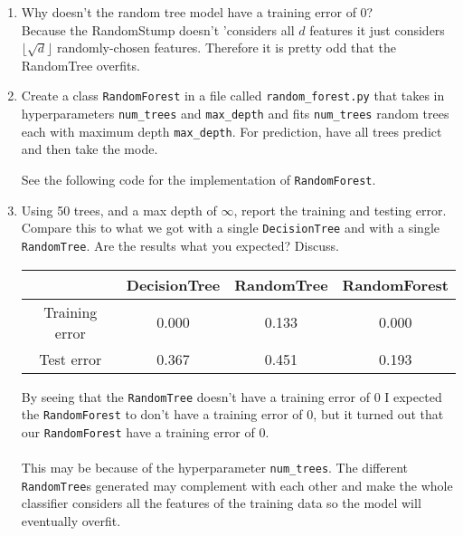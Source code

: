 \documentclass{article}
\def\blu#1{{\color{blu}#1}}
\def\ans#1{{\color{ans}#1}}
\def\enum#1{\begin{enumerate}#1\end{enumerate}}
\begin{document}
\blu{
\enum{
\item Why doesn't the random tree model have a training error of 0? \\
\ans{
   Because the RandomStump doesn't 'considers all $d$ features it just considers 
   $\lfloor \sqrt{d} \rfloor$ randomly-chosen features. Therefore it is pretty odd that the RandomTree 
   overfits.
}
\item Create a class \texttt{RandomForest} in a file called \texttt{random\string_forest.py} that takes in hyperparameters \texttt{num\string_trees} and \texttt{max\string_depth} and
fits \texttt{num\string_trees} random trees each with maximum depth \texttt{max\string_depth}. For prediction, have all trees predict and then take the mode. \\
\ans{
   See the following code for the implementation of \texttt{RandomForest}.\\
   \begin{center}
      
  \end{center}
}
\item Using 50 trees, and a max depth of $\infty$, report the training and testing error. Compare this to what we got with a single \texttt{DecisionTree} and with a single \texttt{RandomTree}. Are the results what you expected? Discuss. \\
\ans{
   \scriptsize
   \setlength{\tabcolsep}{2pt}
   \begin{center}
   \begin{tabular}{SSSS} \toprule
      {} & {DecisionTree} & {RandomTree} & {RandomForest} \\ \midrule
      {Training error} & 0.000 & 0.133 &  0.000 \\ 
      {Test error} & 0.367 & 0.451 & 0.193 \\ \bottomrule
   \end{tabular}
   \end{center}
   \normalsize
   By seeing that the \texttt{RandomTree} doesn't have a training error of $0$ I expected the 
   \texttt{RandomForest} to don't have a training error of $0$, but it turned out that
   our \texttt{RandomForest} have a training error of 0. \\ \\ 
   This may be because of the hyperparameter \texttt{num\string_trees}. The different \texttt{RandomTree}s 
   generated may complement with each other and make the whole classifier considers all the features of 
   the training data so the model will eventually overfit.
}}}
\end{document}
